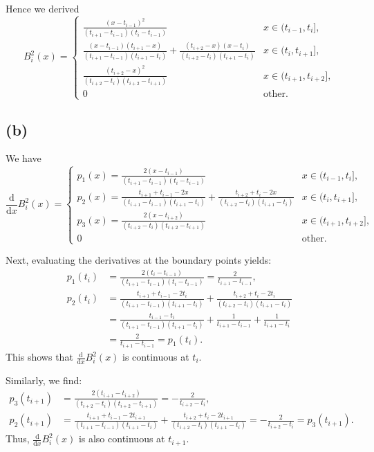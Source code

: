 \documentclass[a4paper]{article}
\begin{document}
Hence we derived
\[
B_i^2(x) = 
\begin{cases} 
    \frac{(x - t_{i-1})^2}{(t_{i+1} - t_{i-1})(t_i - t_{i-1})} &  x \in (t_{i-1}, t_i], \\ 
    \frac{(x - t_{i-1})(t_{i+1} - x)}{(t_{i+1} - t_{i-1})(t_{i+1} - t_i)} + \frac{(t_{i+2} - x)(x - t_i)}{(t_{i+2} - t_i)(t_{i+1} - t_i)} &  x \in (t_i, t_{i+1}], \\ 
    \frac{(t_{i+2} - x)^2}{(t_{i+2} - t_i)(t_{i+2} - t_{i+1})} &  x \in (t_{i+1}, t_{i+2}], \\ 
    0 & \text{other}.
\end{cases}
\]

\subsection*{(b)}
We have
\[
\frac{\text{d}}{\text{d}x}B_i^2(x) = 
\begin{cases} 
    p_1(x) = \frac{2(x-t_{i-1})}{(t_{i+1}-t_{i-1})(t_i-t_{i-1})} & x \in (t_{i-1}, t_i], \\ 
    p_2(x) = \frac{t_{i+1}+t_{i-1}-2x}{(t_{i+1}-t_{i-1})(t_{i+1}-t_i)} + \frac{t_{i+2}+t_i-2x}{(t_{i+2}-t_i)(t_{i+1}-t_i)} & x \in (t_i, t_{i+1}], \\ 
    p_3(x) = \frac{2(x-t_{i+2})}{(t_{i+2}-t_i)(t_{i+2}-t_{i+1})} & x \in (t_{i+1}, t_{i+2}], \\ 
    0 & \text{other}.
\end{cases}
\]

Next, evaluating the derivatives at the boundary points yields:
\begin{align*}
    p_1(t_i) & = \frac{2(t_i-t_{i-1})}{(t_{i+1}-t_{i-1})(t_i-t_{i-1})} = \frac{2}{t_{i+1}-t_{i-1}}, \\
    p_2(t_i) & = \frac{t_{i+1}+t_{i-1}-2t_i}{(t_{i+1}-t_{i-1})(t_{i+1}-t_i)} + \frac{t_{i+2}+t_i-2t_i}{(t_{i+2}-t_i)(t_{i+1}-t_i)} \\
              & = \frac{t_{i-1}-t_i}{(t_{i+1}-t_{i-1})(t_{i+1}-t_i)} + \frac{1}{t_{i+1}-t_{i-1}} + \frac{1}{t_{i+1}-t_i} \\
              & = \frac{2}{t_{i+1}-t_{i-1}} = p_1(t_i).
\end{align*}
This shows that \(\frac{\text{d}}{\text{d}x}B_i^2(x)\) is continuous at \(t_i\). 

Similarly, we find:
\begin{align*}
    p_3(t_{i+1}) & = \frac{2(t_{i+1}-t_{i+2})}{(t_{i+2}-t_i)(t_{i+2}-t_{i+1})} = -\frac{2}{t_{i+2}-t_i}, \\
    p_2(t_{i+1}) & = \frac{t_{i+1}+t_{i-1}-2t_{i+1}}{(t_{i+1}-t_{i-1})(t_{i+1}-t_i)} + \frac{t_{i+2}+t_i-2t_{i+1}}{(t_{i+2}-t_i)(t_{i+1}-t_i)} = -\frac{2}{t_{i+2}-t_i} = p_3(t_{i+1}).
\end{align*}
Thus, \(\frac{\text{d}}{\text{d}x}B_i^2(x)\) is also continuous at \(t_{i+1}\).
\end{document}
